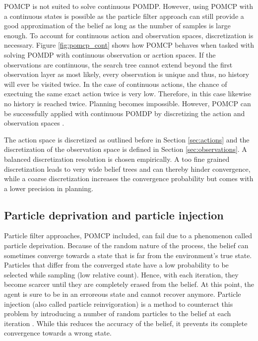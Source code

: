 POMCP is not suited to solve continuous POMDP. However, using POMCP with a continuous states is possible as the particle filter approach can still provide a good approximation of the belief as long as the number of samples is large enough. To account for continuous action and observation spaces, discretization is necessary. Figure \ref{fig:pomcp_cont} shows how POMCP behaves when tasked with solving POMDP with continuous observation or acrtion spaces. If the observations are continuous, the search tree cannot extend beyond the first observation layer as most likely, every observation is unique and thus, no history will ever be visited twice. In the case of continuous actions, the chance of exectuing the same exact action twice is very low. Therefore, in this case likewise no history is reached twice. Planning becomes impossible. However, POMCP can be successfully applied with continuous POMDP by discretizing the action and observation spaces \parencite{pomcp_continuous}.

The action space is discretized as outlined before in Section \ref{sec:actions} and the discretization of the observation space is defined in Section \ref{sec:observations}. A balanced discretization resolution is chosen empirically. A too fine grained discretization leads to very wide belief trees and can thereby hinder convergence, while a coarse discretization increases the convergence probability but comes with a lower precision in planning.

\subsection{Particle deprivation and particle injection}
\label{sec:particle_deprivation}

Particle filter approaches, POMCP included, can fail due to a phenomenon called particle deprivation. Because of the random nature of the process, the belief can sometimes converge towards a state that is far from the environment's true state. Particles that differ from the converged state have a low probability to be selected while sampling (low relative count). Hence, with each iteration, they become scarcer until they are completely erased from the belief. At this point, the agent is sure to be in an erroreous state and cannot recover anymore. Particle injection (also called particle reinvigoration) is a method to counteract this problem by introducing a number of random particles to the belief at each iteration \parencite{decision_making_book}. While this reduces the accuracy of the belief, it prevents its complete convergence towards a wrong state. 

